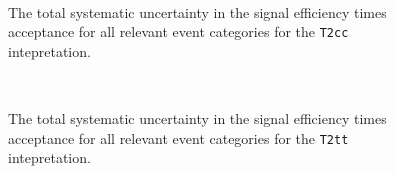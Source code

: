 \begin{figure}[h!]
\begin{center}
{    }                                                                  
    \\
    \caption{\label{fig:sms-total-t2cc}The total systematic
      uncertainty in the signal efficiency times acceptance for all
      relevant event categories for the \texttt{T2cc} intepretation.}
  \end{center}
\end{figure}


\begin{figure}[h!]
  \begin{center}
    \\       
    \caption{\label{fig:sms-total-t2tt}The total systematic
      uncertainty in the signal efficiency times acceptance for all
      relevant event categories for the \texttt{T2tt} intepretation.}
  \end{center}
\end{figure}

